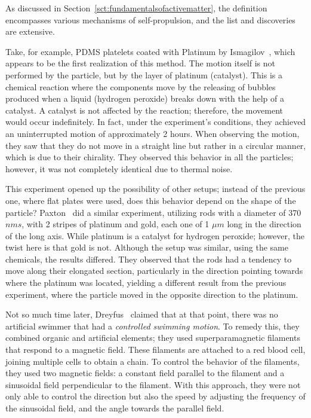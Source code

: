 As discussed in Section~\ref{sct:fundamentalsofactivematter}, the definition encompasses various mechanisms of self-propulsion, and the list and discoveries are extensive.

Take, for example, PDMS platelets coated with Platinum by Ismagilov~\cite{ismagilov2002autonomous}, which appears to be the first realization of this method. The motion itself is not performed by the particle, but by the layer of platinum (catalyst). This is a chemical reaction where the components move by the releasing of bubbles produced when a liquid (hydrogen peroxide) breaks down with the help of a catalyst. A catalyst is not affected by the reaction; therefore, the movement would occur indefinitely. In fact, under the experiment's conditions, they achieved an uninterrupted motion of approximately 2 hours. 
When observing the motion, they saw that they do not move in a straight line but rather in a circular manner, which is due to their chirality. They observed this behavior in all the particles; however, it was not completely identical due to thermal noise.  


This experiment opened up the possibility of other setups; instead of the previous one, where flat plates were used, does this behavior depend on the shape of the particle? Paxton~\cite{paxton2004catalytic} did a similar experiment, utilizing rods with a diameter of  370 $nms$, with 2 stripes of platinum and gold, each one of 1 $\mu m$ long in the direction of the long axis. While platinum is a catalyst for hydrogen peroxide; however, the twist here is that gold is not. Although the setup was similar, using the same chemicals, the results differed. They observed that the rods had a tendency to move along their elongated section, particularly in the direction pointing towards where the platinum was located, yielding a different result from the previous experiment, where the particle moved in the opposite direction to the platinum.

Not so much time later, Dreyfus~\cite{dreyfus2005microscopic} claimed that at that point, there was no artificial swimmer that had a \textit{controlled swimming motion}. To remedy this, they combined organic and artificial elements; they used superparamagnetic filaments that respond to a magnetic field. These filaments are attached to a red blood cell, joining multiple cells to obtain a chain. To control the behavior of the filaments, they used two magnetic fields: a constant field parallel to the filament and a sinusoidal field perpendicular to the filament. With this approach, they were not only able to control the direction but also the speed by adjusting the frequency of the sinusoidal field, and the angle towards the parallel field.

